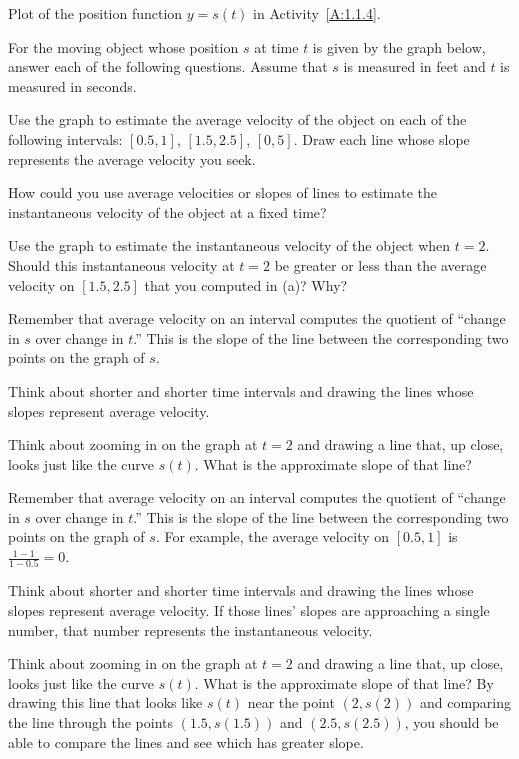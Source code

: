 \begin{marginfigure}
\caption{Plot of the position function $y = s(t)$ in Activity~\ref{A:1.1.4}.}
\end{marginfigure}

\begin{activity} \label{A:1.1.4}
For the moving object whose position $s$ at time $t$ is given by the graph below, answer each of the following questions.  Assume that $s$ is measured in feet and $t$ is measured in seconds.

\ba
	\item Use the graph to estimate the average velocity of the object on each of the following intervals: $[0.5,1]$, $[1.5,2.5]$, $[0,5]$.  Draw each line whose slope represents the average velocity you seek.
	\item How could you use average velocities or slopes of lines to estimate the instantaneous velocity of the object at a fixed time?
	\item Use the graph to estimate the instantaneous velocity of the object when $t = 2$.  Should this instantaneous velocity at $t = 2$ be greater or less than the average velocity on $[1.5,2.5]$ that you computed in (a)?  Why?
\ea
\end{activity} 
\begin{smallhint}
\ba
	\item Remember that average velocity on an interval computes the quotient of ``change in $s$ over change in $t$.''  This is the slope of the line between the corresponding two points on the graph of $s$.
	\item Think about shorter and shorter time intervals and drawing the lines whose slopes represent average velocity.
	\item Think about zooming in on the graph at $t = 2$ and drawing a line that, up close, looks just like the curve $s(t)$.  What is the approximate slope of that line?
\ea
\end{smallhint}
\begin{bighint}
\ba
	\item Remember that average velocity on an interval computes the quotient of ``change in $s$ over change in $t$.''  This is the slope of the line between the corresponding two points on the graph of $s$.  For example, the average velocity on $[0.5,1]$ is $\frac{1-1}{1-0.5} = 0$.
	\item Think about shorter and shorter time intervals and drawing the lines whose slopes represent average velocity.  If those lines' slopes are approaching a single number, that number represents the instantaneous velocity.
	\item Think about zooming in on the graph at $t = 2$ and drawing a line that, up close, looks just like the curve $s(t)$.  What is the approximate slope of that line?  By drawing this line that looks like $s(t)$ near the point $(2,s(2))$ and comparing the line through the points $(1.5,s(1.5))$ and $(2.5, s(2.5))$, you should be able to compare the lines and see which has greater slope.
\ea
\end{bighint}
